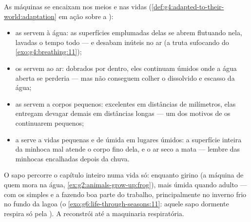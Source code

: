 \begin{proposition}\label{prop:g7:how-animals-breathe:fits}
As máquinas se encaixam nos meios e nas vidas
(\cref{def:g4:adapted-to-their-world:adaptation} em ação sobre a
):
\begin{itemize}
  \item as  servem à água: as superfícies emplumadas delas
        se abrem flutuando nela, lavadas o tempo todo --- e desabam
        inúteis no ar (a truta sufocando do
        \cref{exo:g4:breathing:11});
  \item os  servem ao ar: dobrados por dentro, eles continuam
        úmidos onde a água aberta se perderia --- mas não conseguem
        colher o  dissolvido e escasso da água;
  \item as  servem a corpos pequenos: excelentes em
        distâncias de milímetros, elas entregam devagar demais em
        distâncias longas --- um dos motivos de os  continuarem
        pequenos;
  \item a  serve a vidas pequenas e de  úmida
        em lugares úmidos: a superfície inteira da minhoca mal atende
        o corpo fino dela, e o ar seco a mata --- lembre das minhocas
        encalhadas depois da chuva.
\end{itemize}
\end{proposition}
\admitted

\begin{example}\label{ex:g7:how-animals-breathe:frog}
O sapo percorre o capítulo inteiro numa vida só:  enquanto
girino (a máquina de quem mora na água,
\cref{ex:g2:animals-grow-up:frog}),  mais  úmida quando
adulto --- com os  simples e a  fazendo boa parte do
trabalho, principalmente no inverno frio no fundo da lagoa (o
\cref{exo:g6:life-through-seasons:11}: aquele sapo dormente respira só
pela ). A  reconstrói até a maquinaria respiratória.
\end{example}

